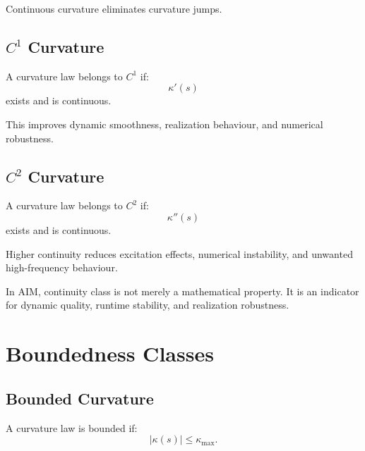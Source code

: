 Continuous curvature eliminates curvature jumps.


\subsection{\texorpdfstring{$C^1$}{C1} Curvature}

\begin{definition}
\label{def:c1-curvature}
A curvature law belongs to \(C^1\) if:
\[
\kappa'(s)
\]
exists and is continuous.
\end{definition}

This improves dynamic smoothness, realization behaviour, and numerical
robustness.


\subsection{\texorpdfstring{$C^2$}{C2} Curvature}

\begin{definition}
\label{def:c2-curvature}
A curvature law belongs to \(C^2\) if:
\[
\kappa''(s)
\]
exists and is continuous.
\end{definition}

Higher continuity reduces excitation effects, numerical instability, and
unwanted high-frequency behaviour.

In AIM, continuity class is not merely a mathematical property. It is an
indicator for dynamic quality, runtime stability, and realization
robustness.

\section{Boundedness Classes}

\subsection{Bounded Curvature}

\begin{definition}
\label{def:bounded-curvature}
A curvature law is bounded if:
\[
|\kappa(s)|
\le
\kappa_{\max}.
\]
\end{definition}

